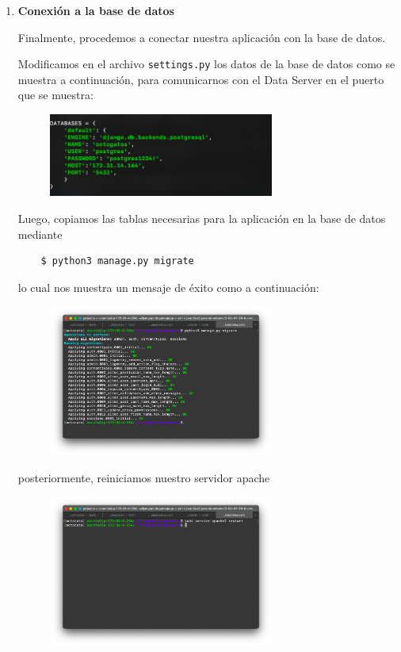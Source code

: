 \documentclass{article}
\begin{document}
\begin{enumerate}
    \item {\bf Conexión a la base de datos}

    Finalmente, procedemos a conectar nuestra aplicación con la base de datos.

    Modificamos en el archivo \texttt{settings.py} los datos de la base de
    datos como se muestra a continuación, para comunicarnos con el Data Server
    en el puerto que se muestra:

    \begin{figure}[H]
      \centering
      \includegraphics[width=0.70\textwidth]{AppServer/r1}
    \end{figure}

    Luego, copiamos las tablas necesarias para la aplicación en la base de datos
    mediante
    \begin{lstlisting}
    $ python3 manage.py migrate
    \end{lstlisting}

    lo cual nos muestra un mensaje de éxito como a continuación:

    \begin{figure}[H]
      \centering
      \includegraphics[width=0.70\textwidth]{AppServer/r2}
    \end{figure}

    posteriormente, reiniciamos nuestro servidor apache

    \begin{figure}[H]
        \centering
        \includegraphics[width=0.70\textwidth]{AppServer/r3}
    \end{figure}


\end{enumerate}
\end{document}
